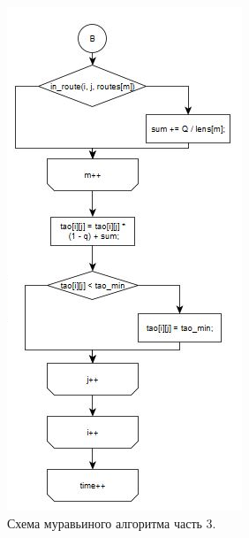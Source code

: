 \documentclass[a4paper,oneside,14pt]{extreport}
\begin{document}
\begin{figure}[H]
	\begin{center}
		\includegraphics[scale=1]{images/formic3.png}
		\caption{Схема муравьиного алгоритма часть 3.}
		\label{fig:formic3}
	\end{center}
\end{figure}
\end{document}
